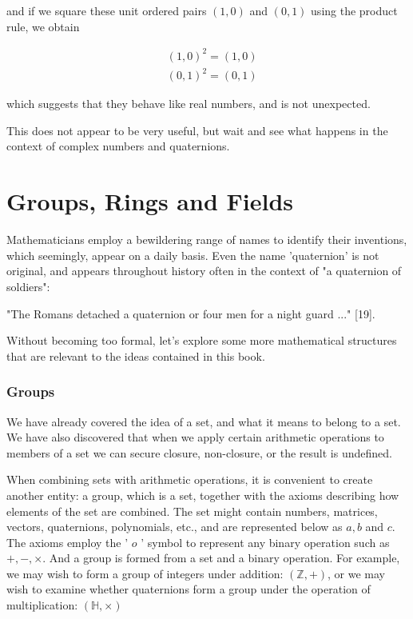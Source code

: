 and if we square these unit ordered pairs $(1,0)$ and $(0,1)$ using the product rule, we obtain

$$
\begin{aligned}
& (1,0)^{2}=(1,0) \\
& (0,1)^{2}=(0,1)
\end{aligned}
$$

which suggests that they behave like real numbers, and is not unexpected.

This does not appear to be very useful, but wait and see what happens in the context of complex numbers and quaternions.

\section{Groups, Rings and Fields}
Mathematicians employ a bewildering range of names to identify their inventions, which seemingly, appear on a daily basis. Even the name 'quaternion' is not original, and appears throughout history often in the context of "a quaternion of soldiers":

"The Romans detached a quaternion or four men for a night guard ..." [19].

Without becoming too formal, let's explore some more mathematical structures that are relevant to the ideas contained in this book.

\subsubsection{Groups}
We have already covered the idea of a set, and what it means to belong to a set. We have also discovered that when we apply certain arithmetic operations to members of a set we can secure closure, non-closure, or the result is undefined.

When combining sets with arithmetic operations, it is convenient to create another entity: a group, which is a set, together with the axioms describing how elements of the set are combined. The set might contain numbers, matrices, vectors, quaternions, polynomials, etc., and are represented below as $a, b$ and $c$. The axioms employ the ' $o$ ' symbol to represent any binary operation such as $+,-, \times$. And a group is formed from a set and a binary operation. For example, we may wish to form a group of integers under addition: $(\mathbb{Z},+)$, or we may wish to examine whether quaternions form a group under the operation of multiplication: $(\mathbb{H}, \times)$

